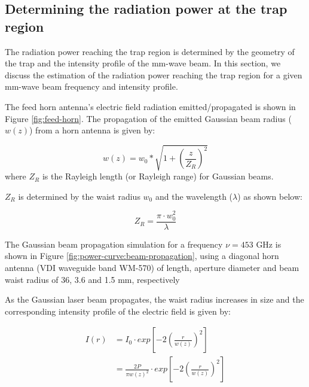 \subsection{Determining the radiation power at the trap region}
\label{subsec:rot:power}

The radiation power reaching the trap region is determined by the geometry of the trap 
and the intensity profile of the mm-wave beam. In this section, we discuss the
estimation of the radiation power reaching the trap region for a given mm-wave beam
frequency and intensity profile.



The feed horn antenna's electric field radiation emitted/propagated is shown in
Figure \ref{fig:feed-horn}. The propagation of the emitted Gaussian beam radius
($w(z)$) from a horn antenna is given by:



\begin{equation}
    w(z) = w_0 * \sqrt{1 + \left( \frac{z}{Z_R} \right) ^2}
    \label{eqn:beam-propagation}
\end{equation}
where $Z_R$ is the Rayleigh length (or Rayleigh range) for Gaussian beams.

$Z_R$  is determined by the waist radius $w_0$ and the wavelength ($\lambda$) as shown below:

\[Z_R = \frac{\pi \cdot w_0^2}{\lambda}\]

The Gaussian beam propagation simulation for a frequency $\nu = 453$ GHz is
shown in Figure \ref{fig:power-curve:beam-propagation}, 
using a diagonal horn antenna (VDI waveguide band WM-570) of length, 
aperture diameter and beam waist radius of 36, 3.6 and 1.5 mm, respectively



As the Gaussian laser beam propagates, the waist radius increases in size and
the corresponding intensity profile of the electric field is given by:

\begin{equation}
    \begin{split}
        I(r) & = I_0 \cdot exp \left[ -2 \left (\frac{r}{w(z)}\right ) ^2\right] \\
        & = \frac{2P}{\pi w(z)^2}
        \cdot exp \left[ -2 \left (\frac{r}{w(z)}\right ) ^2\right]
    \end{split}
    \label{eqn:beam-propagation:intensity}
\end{equation}

